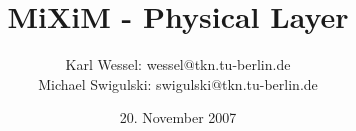 \documentclass[10pt, a4paper]{article}
\begin{document}
\title{MiXiM - Physical Layer}
\author{Karl Wessel: wessel$@$tkn.tu-berlin.de\\
Michael Swigulski: swigulski$@$tkn.tu-berlin.de}
\date{20. November 2007}
\maketitle
%

%

\newcommand{\h}[1]{\textit{#1}}
\newcommand{\bp}{BasePhyLayer}
\newcommand{\bm}{BaseMacLayer}







%
\end{document}
